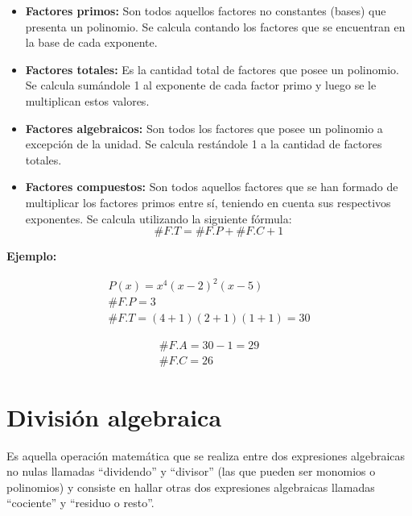 \documentclass[11pt,a4paper]{article}
\newcommand{\hl}[1]{\textcolor{resaltado}{#1}}
\begin{document}
\begin{itemize}[label=\checkmark]
  \item \textbf{Factores primos:} Son todos aquellos factores no constantes \hl{(bases)} que
  presenta un polinomio. Se calcula contando los factores que se encuentran en la base de
  cada exponente.
  \item \textbf{Factores totales:} Es la cantidad total de factores que posee un polinomio.
  Se calcula sumándole 1 al exponente de cada factor primo y luego se le multiplican
  estos valores.
  \item \textbf{Factores algebraicos:} Son todos los factores que posee un polinomio a
  excepción de la unidad. Se calcula restándole 1 a la cantidad de factores totales.
  \item \textbf{Factores compuestos:} Son todos aquellos factores que se han formado de
  multiplicar los factores primos entre sí, teniendo en cuenta sus respectivos
  exponentes. Se calcula utilizando la siguiente fórmula:
  \[\boxed{\#F.T = \#F.P + \#F.C + 1}\]
\end{itemize}

\textcolor{naranja}{\textbf{Ejemplo:}}

\begin{minipage}[t]{0.533\textwidth}
\begin{gather*}
P(x) = x^4(x-2)^2(x-5)\\
\#F.P = 3\\
\#F.T = (4+1)(2+1)(1+1) = 30
\end{gather*}
\end{minipage}\hfill
\begin{minipage}[t]{0.436\textwidth}
\begin{gather*}
\#F.A = 30 - 1 = 29\\
\#F.C = 26
\end{gather*}
\end{minipage}

\newpage
\section{División algebraica}

Es aquella operación matemática que se realiza entre dos expresiones algebraicas no
nulas llamadas ``dividendo'' y ``divisor'' (las que pueden ser monomios o polinomios) y
consiste en hallar otras dos expresiones algebraicas llamadas ``cociente'' y
``residuo o resto''.
\end{document}
